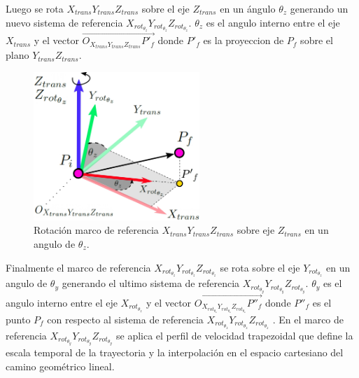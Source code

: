         Luego se rota $X_{trans}Y_{trans}Z_{trans}$ sobre el eje $Z_{trans}$ en un ángulo $\theta_z$ generando un nuevo sistema de referencia $X_{rot_{\theta_z}}Y_{rot_{\theta_z}}Z_{rot_{\theta_z}}$. $\theta_z$  es el angulo interno entre el eje $X_{trans}$ y el vector   $\overrightarrow{O_{X_{trans}Y_{trans}Z_{trans}}{P'}_f}$ donde ${P'}_f$ es la  proyeccion de $P_f$ sobre el plano  $Y_{trans}Z_{trans}$.

        \begin{figure}[htb]
                \centering
                \includegraphics[width=0.56\textwidth]{Main/Chapter6/Images6/DIBUJO532.jpg}
                \caption{Rotación marco de referencia $X_{trans}Y_{trans}Z_{trans}$ sobre eje $Z_{trans}$ en un angulo de $\theta_z$.}
        \end{figure}
    \newpage
        Finalmente el marco de referencia $X_{rot_{\theta_z}}Y_{rot_{\theta_z}}Z_{rot_{\theta_z}}$ se rota sobre el eje  $Y_{rot_{\theta_z}}$ en un angulo de $\theta_y$ generando el ultimo sistema de referencia $X_{rot_{\theta_y}}Y_{rot_{\theta_y}}Z_{rot_{\theta_y}}$.
        $\theta_y$  es el angulo interno entre el eje $X_{rot_{\theta_z}}$ y el vector   $\overrightarrow{O_{X_{rot_{\theta_z}}Y_{rot_{\theta_z}}Z_{rot_{\theta_z}}}{P''}_f}$ donde ${P''}_f$ es el punto  ${P}_f$ con respecto al sistema de referencia  $X_{rot_{\theta_z}}Y_{rot_{\theta_z}}Z_{rot_{\theta_z}}$ .
         En el marco de referencia $X_{rot_{\theta_y}}Y_{rot_{\theta_y}}Z_{rot_{\theta_y}}$ se aplica el perfil de velocidad trapezoidal que define la escala temporal de la trayectoria y la interpolación en el espacio cartesiano del camino geométrico lineal.
         
